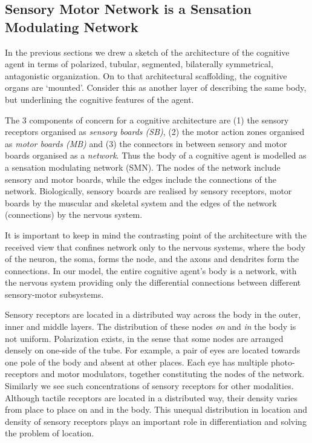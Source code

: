 \subsection{Sensory Motor Network is a Sensation Modulating Network}

In the previous sections we drew a sketch of the architecture of the cognitive agent in terms of polarized, tubular, segmented, bilaterally symmetrical, antagonistic organization. On to that architectural scaffolding, the cognitive organs are `mounted'. Consider this as another layer of describing the same body, but underlining the cognitive features of the agent.

The 3 components of concern for a cognitive architecture are (1) the sensory receptors organised as \textit{sensory boards (SB)}, (2) the motor action zones organised as \textit{motor boards (MB)} and (3) the connectors in between sensory and motor boards organised as a \textit{network}. Thus the body of a cognitive agent is modelled as a sensation modulating network (SMN). The nodes of the network include sensory and motor boards, while the edges include the connections of the network. Biologically, sensory boards are realised by sensory receptors, motor boards by the muscular and skeletal system and the edges of the network (connections) by the nervous system.

It is important to keep in mind the contrasting point of the architecture with the received view that confines network only to the nervous systems, where the body of the neuron, the soma, forms the node, and the axons and dendrites form the connections. In our model, the entire cognitive agent's body is a network, with the nervous system providing only the differential connections between different sensory-motor subsystems. 

Sensory receptors are located in a distributed way across the body in the outer, inner and middle layers. The distribution of these nodes \textit{on} and \textit{in} the body is not uniform. Polarization exists, in the sense that some nodes are arranged densely on one-side of the tube. For example, a pair of eyes are located towards one pole of the body and absent at other places. Each eye has multiple photo-receptors and motor modulators, together constituting the nodes of the network. Similarly we see such concentrations of sensory receptors for other modalities. Although tactile receptors are located in a distributed way, their density varies from place to place on and in the body. This unequal distribution in location and density of sensory receptors plays an important role in differentiation and solving the problem of location.

